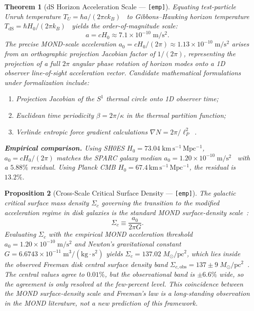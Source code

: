 \documentclass[12pt,letterpaper]{article}
\theoremstyle{plain}
\newtheorem{theorem}{Theorem}[section]
\newtheorem{proposition}[theorem]{Proposition}
\theoremstyle{definition}
\begin{document}
\begin{theorem}[dS Horizon Acceleration Scale --- {\normalfont\texttt{[emp]}}]
\label{thm:ds_scale}
Equating test-particle Unruh temperature $T_U = \hbar a/(2\pi c k_B)$~\cite{unruh1976} to Gibbons--Hawking horizon temperature $T_{\mathrm{dS}} = \hbar H_0/(2\pi k_B)$~\cite{gibbonshawking1977} yields the order-of-magnitude scale:
\begin{equation}\label{eq:a0_naive}
  a = c H_0 \approx 7.1 \times 10^{-10}\;\mathrm{m/s^2}.
\end{equation}
The precise MOND-scale acceleration $a_0 = cH_0/(2\pi) \approx 1.13 \times 10^{-10}\;\mathrm{m/s^2}$ arises from an orthographic projection Jacobian factor of $1/(2\pi)$, representing the projection of a full $2\pi$ angular phase rotation of horizon modes onto a 1D observer line-of-sight acceleration vector. Candidate mathematical formulations under formalization include:
\begin{enumerate}[label=(\roman*),nosep]
  \item Projection Jacobian of the $S^1$ thermal circle onto 1D observer time;
  \item Euclidean time periodicity $\beta = 2\pi / \kappa$ in the thermal partition function;
  \item Verlinde entropic force gradient calculations $\nabla N = 2\pi / \ell_P^2$~\cite{verlinde2011}.
\end{enumerate}

\medskip\noindent
\textbf{Empirical comparison.} Using SH0ES $H_0 = 73.04\;\mathrm{km\,s^{-1}\,Mpc^{-1}}$, $a_0 = cH_0/(2\pi)$ matches the SPARC galaxy median $a_0 = 1.20 \times 10^{-10}\;\mathrm{m/s^2}$~\cite{milgrom1983} with a $5.88\%$ residual. Using Planck CMB $H_0 = 67.4\,\mathrm{km\,s^{-1}\,Mpc^{-1}}$, the residual is $13.2\%$.
\end{theorem}

\begin{proposition}[Cross-Scale Critical Surface Density --- {\normalfont\texttt{[emp]}}]
\label{thm:sigma_crit}
The galactic critical surface mass density $\Sigma_c$ governing the transition to the modified acceleration regime in disk galaxies is the standard MOND surface-density scale~\cite{milgrom1983}:
\begin{equation}\label{eq:sigma_crit}
  \Sigma_c \equiv \frac{a_0}{2\pi G}.
\end{equation}
Evaluating $\Sigma_c$ with the empirical MOND acceleration threshold $a_0 = 1.20 \times 10^{-10}\;\mathrm{m/s^2}$ and Newton's gravitational constant $G = 6.6743 \times 10^{-11}\;\mathrm{m^3/(kg\cdot s^2)}$ yields $\Sigma_c = 137.02\;M_\odot/\mathrm{pc}^2$, which lies inside the observed Freeman disk central surface density band $\Sigma_{c,\mathrm{obs}} = 137 \pm 9\;M_\odot/\mathrm{pc}^2$~\cite{freeman1970}. The central values agree to $0.01\%$, but the observational band is $\pm 6.6\%$ wide, so the agreement is only resolved at the few-percent level. This coincidence between the MOND surface-density scale and Freeman's law is a long-standing observation in the MOND literature, not a new prediction of this framework.
\end{proposition}
\end{document}
